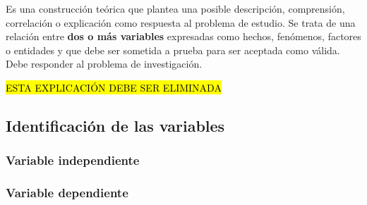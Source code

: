 Es una construcci\'{o}n te\'{o}rica que plantea una posible descripci\'{o}n, comprensi\'{o}n, 
correlaci\'{o}n o explicaci\'{o}n como respuesta al problema de estudio. Se trata de una 
relaci\'{o}n entre \textbf{dos o m\'{a}s variables} expresadas como hechos, fen\'{o}menos, 
factores o entidades y que debe ser sometida a prueba para ser aceptada como v\'{a}lida. Debe 
responder al problema de investigaci\'{o}n.

\hl{ESTA EXPLICACI\'{O}N DEBE SER ELIMINADA} 


\subsection{Identificaci\'on de las variables}
\label{cap0:sub:identificacion_de_las_variables}

\subsubsection{Variable independiente}
\label{cap0:sub:variable_independiente}

\subsubsection{Variable dependiente}
\label{cap0:sub:variable_dependiente}



\let\thesection\oldthesection


